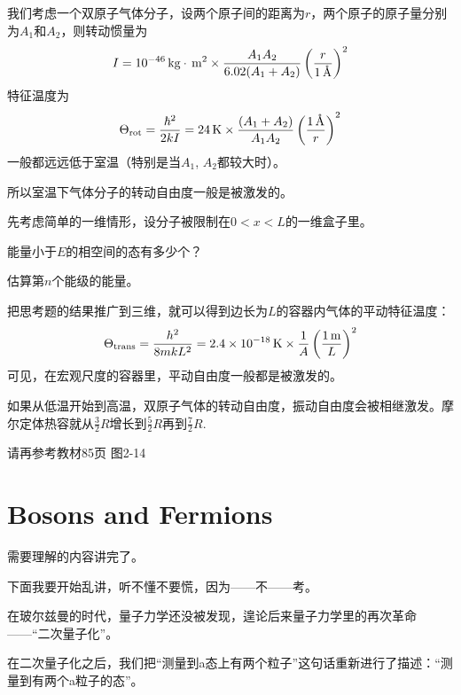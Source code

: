 \documentclass[CJK]{beamer}
\begin{document}
\begin{frame}
\bch
我们考虑一个双原子气体分子，设两个原子间的距离为$r$，两个原子的原子量分别为$A_1$和$A_2$，则转动惯量为
$$I = 10^{-46} \,\mathrm{kg}\cdot\,\mathrm{m}^2 \times \frac{ A_1A_2}{6.02(A_1+A_2)} \left(\frac{r}{1\,\text{\AA}}\right)^2 $$
 特征温度为
$$\Theta_{\rm rot} =  \frac{\hbar^2}{2kI} = 24\,\mathrm{K} \times \frac{(A_1+A_2)}{ A_1A_2} \left(\frac{1\,\text{\AA}}{r}\right)^2$$
一般都远远低于室温（特别是当$A_1$, $A_2$都较大时）。

所以{\blue 室温下气体分子的转动自由度一般是被激发的}。
\ech
\end{frame}


\begin{frame}
\bch
先考虑简单的一维情形，设分子被限制在$0<x<L$的一维盒子里。
\bitem
\item{能量小于$E$的相空间的态有多少个？}
\item{估算第$n$个能级的能量。}
\eitem
\ech
\end{frame}

\begin{frame}
\bch
把思考题的结果推广到三维，就可以得到边长为$L$的容器内气体的平动特征温度：
$$\Theta_{\rm trans} = \frac{h^2}{8mkL^2} = 2.4\times 10^{-18}\,\mathrm{K} \times \frac{1}{A}\left(\frac{1\,\mathrm{m}}{L}\right)^2$$
可见，在{\blue 宏观尺度的容器里，平动自由度一般都是被激发的}。
\ech
\end{frame}


\begin{frame}
\bch
如果从低温开始到高温，双原子气体的转动自由度，振动自由度会被相继激发。摩尔定体热容就从$\frac{3}{2}R$增长到$\frac{5}{2}R$再到$\frac{7}{2}R$.


请再参考教材85页 图2-14
\ech
\end{frame}

\section{Bosons and Fermions}

\begin{frame}
\bch
需要理解的内容讲完了。

\skiplines

下面我要开始乱讲，听不懂不要慌，因为——不——考。
\ech
\end{frame}

\begin{frame}
\bch
在玻尔兹曼的时代，量子力学还没被发现，遑论后来量子力学里的再次革命——“二次量子化”。

\skiplines

在二次量子化之后，我们把“测量到a态上有两个粒子”这句话重新进行了描述：“测量到有两个a粒子的态”。

\skipline

\ech
\end{frame}
\end{document}
